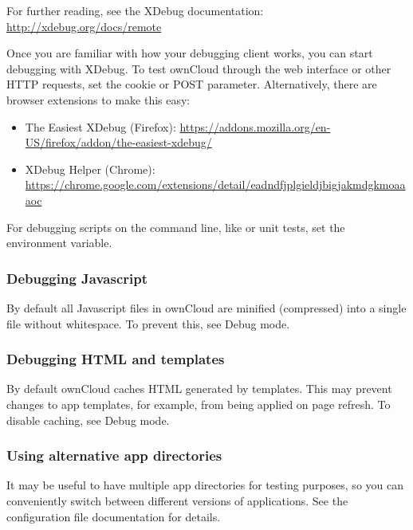 \documentclass[letterpaper,10pt,english]{sphinxmanual}
\begin{document}
For further reading, see the XDebug documentation: \href{http://xdebug.org/docs/remote}{http://xdebug.org/docs/remote}

Once you are familiar with how your debugging client works, you can start debugging with XDebug. To test ownCloud through the web interface or other HTTP requests, set the  cookie or POST parameter. Alternatively, there are browser extensions to make this easy:
\begin{itemize}
\item {} 
The Easiest XDebug (Firefox): \href{https://addons.mozilla.org/en-US/firefox/addon/the-easiest-xdebug/}{https://addons.mozilla.org/en-US/firefox/addon/the-easiest-xdebug/}

\item {} 
XDebug Helper (Chrome): \href{https://chrome.google.com/extensions/detail/eadndfjplgieldjbigjakmdgkmoaaaoc}{https://chrome.google.com/extensions/detail/eadndfjplgieldjbigjakmdgkmoaaaoc}

\end{itemize}

For debugging scripts on the command line, like  or unit tests, set the  environment variable.


\subsubsection{Debugging Javascript}
\label{general/debugging:debugging-javascript}
By default all Javascript files in ownCloud are minified (compressed) into a single file without whitespace. To prevent this, see Debug mode.


\subsubsection{Debugging HTML and templates}
\label{general/debugging:debugging-html-and-templates}
By default ownCloud caches HTML generated by templates. This may prevent changes to app templates, for example, from being applied on page refresh. To disable caching, see Debug mode.


\subsubsection{Using alternative app directories}
\label{general/debugging:using-alternative-app-directories}
It may be useful to have multiple app directories for testing purposes, so you can conveniently switch between different versions of applications. See the configuration file documentation for details.
\end{document}
